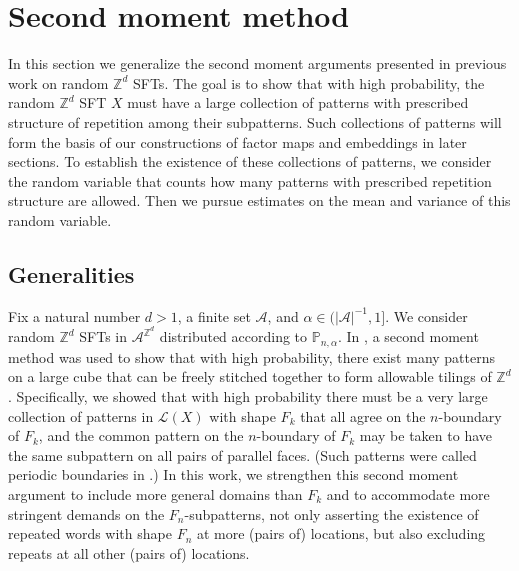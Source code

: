 \documentclass[12pt]{amsart}
\theoremstyle{definition}
\begin{document}
\section{Second moment method} \label{Sect:SecondMomentMethod}

In this section we generalize the second moment arguments presented in previous work on random $\mathbb{Z}^d$ SFTs. The goal is to show that with high probability, the random $\mathbb{Z}^d$ SFT $X$ must have a large collection of patterns with prescribed structure of repetition among their subpatterns. Such collections of patterns will form the basis of our constructions of factor maps and embeddings in later sections. To establish the existence of these collections of patterns, we consider the random variable that counts how many patterns with prescribed repetition structure are allowed. Then we pursue estimates on the mean and variance of this random variable.

\subsection{Generalities}

Fix a natural number $d>1$, a finite set $\mathcal{A}$, and $\alpha \in (|\mathcal{A}|^{-1}, 1]$. We consider random $\mathbb{Z}^d$ SFTs in $\mathcal{A}^{\mathbb{Z}^d}$ distributed according to $\mathbb{P}_{n,\alpha}$. In \cite{McGoffPavlov}, a second moment method was used to show that with high probability, there exist many patterns on a large cube that can be freely stitched together to form allowable tilings of $\mathbb{Z}^d$. 
Specifically, we showed that with high probability there must be a very large collection of patterns in $\mathcal{L}(X)$ with shape $F_k$ that all agree on the $n$-boundary of $F_k$, and the common pattern on the $n$-boundary of $F_k$ may be taken to have the same subpattern on all pairs of parallel faces. (Such patterns were called periodic boundaries in \cite{McGoffPavlov}.) 
In this work, we strengthen this second moment argument to include more general domains than $F_k$ and to accommodate more stringent demands on the $F_n$-subpatterns, not only asserting the existence of repeated words with shape $F_n$ at more (pairs of) locations, but also excluding repeats at all other (pairs of) locations. %



\end{document}
